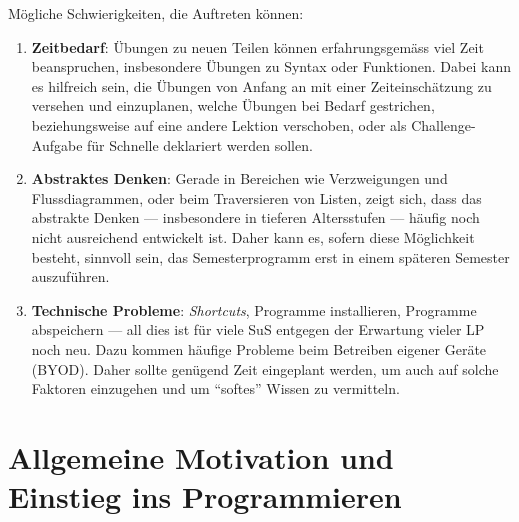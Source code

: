 Mögliche Schwierigkeiten, die Auftreten können:
\begin{enumerate}
\item \textbf{Zeitbedarf}: Übungen zu neuen Teilen können erfahrungsgemäss viel Zeit beanspruchen, insbesondere Übungen zu Syntax oder Funktionen. Dabei kann es hilfreich sein, die Übungen von Anfang an mit einer Zeiteinschätzung zu versehen und einzuplanen, welche Übungen bei Bedarf gestrichen, beziehungsweise auf eine andere Lektion verschoben, oder als Challenge-Aufgabe für Schnelle deklariert werden sollen.
\item \textbf{Abstraktes Denken}: Gerade in Bereichen wie Verzweigungen und Flussdiagrammen, oder beim Traversieren von Listen, zeigt sich, dass das abstrakte Denken --- insbesondere in tieferen Altersstufen --- häufig noch nicht ausreichend entwickelt ist. Daher kann es, sofern diese Möglichkeit besteht, sinnvoll sein, das Semesterprogramm erst in einem späteren Semester auszuführen.
\item \textbf{Technische Probleme}: \textit{Shortcuts}, Programme installieren, Programme abspeichern --- all dies ist für viele SuS entgegen der Erwartung vieler LP noch neu. Dazu kommen häufige Probleme beim Betreiben eigener Geräte (BYOD). Daher sollte genügend Zeit eingeplant werden, um auch auf solche Faktoren einzugehen und um ``softes'' Wissen zu vermitteln.
\end{enumerate}

\clearpage

\section{Allgemeine Motivation und Einstieg ins Programmieren}

